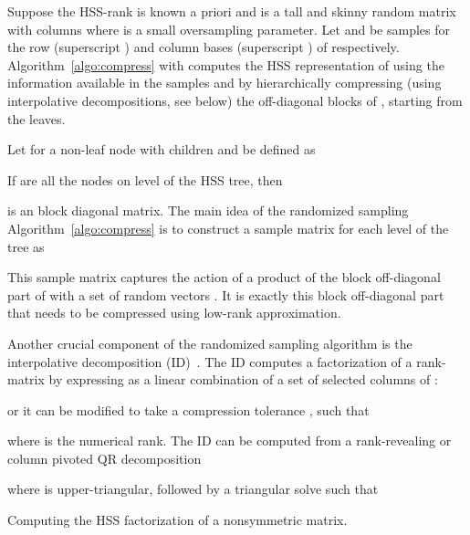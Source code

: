 \documentclass{article}
\begin{document}
Suppose the HSS-rank  is known a priori and  is a tall and skinny random matrix with 
columns where  is a small oversampling parameter.
Let  and  be samples for the row (superscript
) and column bases (superscript ) of 
respectively. Algorithm~\ref{algo:compress} with  computes the HSS representation of  using the information
available in the samples  and  by hierarchically compressing
(using interpolative decompositions, see below) the off-diagonal
blocks of , starting from the leaves.

Let  for a non-leaf node  with children  and
  be defined as

If  are all the nodes on level 
of the HSS tree, then 

is an  block diagonal matrix. The main idea of the
randomized sampling Algorithm~\ref{algo:compress} is to construct a
sample matrix  for each level of the tree as

This sample matrix  captures the action of a product of
the block off-diagonal part of  with a set of random vectors
. It is exactly this block off-diagonal part that needs to be
compressed using low-rank approximation.


Another crucial component of the randomized sampling algorithm is the
interpolative decomposition (ID)~\cite{cheng2005compression}. The ID
computes a factorization of a rank- matrix  by expressing  as a linear combination of a set  of
 selected columns of :

or it can be modified to take a compression tolerance ,
such that

where  is the numerical rank. The ID can be computed from a
rank-revealing or column pivoted QR
decomposition~\cite{chan1987rank,quintana1998blas}

where  is upper-triangular, followed by a triangular solve such
that


\begin{algorithm}[!ht]
  \DontPrintSemicolon
  \SetAlgoLined

  \caption{\footnotesize Computing the HSS factorization of a nonsymmetric
    matrix. }
  \label{algo:compress}
\end{algorithm}
\end{document}
